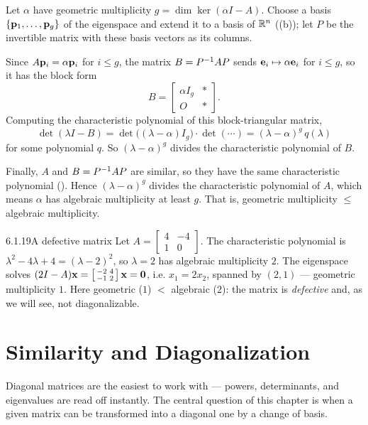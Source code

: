 \begin{prf}
Let $\alpha$ have geometric multiplicity $g=\dim\ker(\alpha I-A)$. Choose a basis $\{\mathbf{p}_1,\dots,\mathbf{p}_g\}$ of the eigenspace and extend it to a basis of $\mathbb{R}^n$ ((b)); let $P$ be the invertible matrix with these basis vectors as its columns.

Since $A\mathbf{p}_i=\alpha\mathbf{p}_i$ for $i\le g$, the matrix $B=P^{-1} AP$ sends $\mathbf{e}_i\mapsto\alpha\mathbf{e}_i$ for $i\le g$, so it has the block form
\[
B=\begin{bmatrix}\alpha I_g & *\\ O & *\end{bmatrix}.
\]
Computing the characteristic polynomial of this block-triangular matrix,
\[
\det(\lambda I-B)=\det\bigl((\lambda-\alpha)I_g\bigr)\cdot\det(\cdots)=(\lambda-\alpha)^g\,q(\lambda)
\]
for some polynomial $q$. So $(\lambda-\alpha)^g$ divides the characteristic polynomial of $B$.

Finally, $A$ and $B=P^{-1} AP$ are similar, so they have the same characteristic polynomial (). Hence $(\lambda-\alpha)^g$ divides the characteristic polynomial of $A$, which means $\alpha$ has algebraic multiplicity at least $g$. That is, geometric multiplicity $\le$ algebraic multiplicity.
\end{prf}

\begin{exmp}{6.1.19}{A defective matrix}
Let $A=\left[\begin{smallmatrix}4&-4\\1&0\end{smallmatrix}\right]$. The characteristic polynomial is $\lambda^2-4\lambda+4=(\lambda-2)^2$, so $\lambda=2$ has algebraic multiplicity $2$. The eigenspace solves $(2I-A)\mathbf{x}=\left[\begin{smallmatrix}-2&4\\-1&2\end{smallmatrix}\right]\mathbf{x}=\mathbf{0}$, i.e. $x_1=2x_2$, spanned by $(2,1)$ --- geometric multiplicity $1$. Here geometric ($1$) $<$ algebraic ($2$): the matrix is \emph{defective} and, as we will see, not diagonalizable.
\end{exmp}

\section{Similarity and Diagonalization}
\label{sec:6.2}

Diagonal matrices are the easiest to work with --- powers, determinants, and eigenvalues are read off instantly. The central question of this chapter is when a given matrix can be transformed into a diagonal one by a change of basis.


